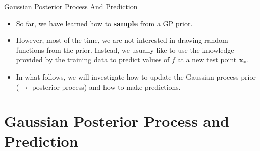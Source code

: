 








\begin{vbframe}{Gaussian Posterior Process And Prediction}

\vspace*{1cm}

\begin{itemize}
  \item So far, we have learned how to \textbf{sample} from a GP prior.
\item However, most of the time, we are not interested in drawing random functions from the prior. Instead, we usually like to use the knowledge provided by the training data to predict values of $f$ at a new test point $\mathbf{x}_*$. 
\item In what follows, we will investigate how to update the Gaussian process prior ($\to$ posterior process) and how to make predictions.
\end{itemize}

\end{vbframe}

\section{Gaussian Posterior Process and Prediction}


